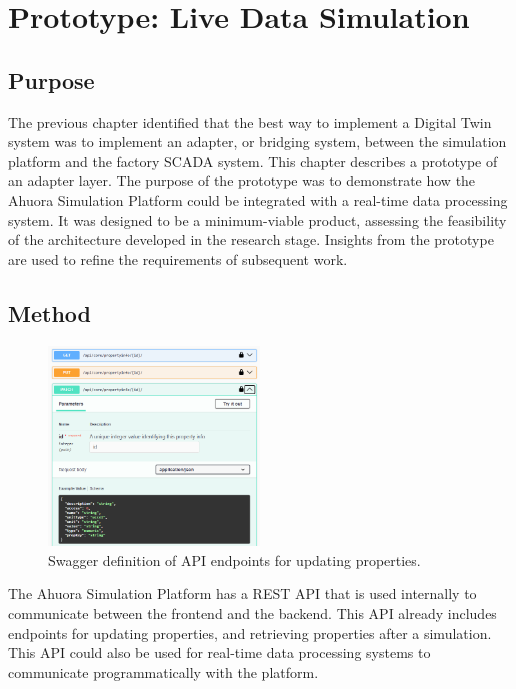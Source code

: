 \chapter{Prototype: Live Data Simulation} \label{sec:simulationprototype}

\section{Purpose}

The previous chapter identified that the best way to implement a Digital Twin system was to implement an adapter, or bridging system, between the simulation platform and the factory SCADA system. This chapter describes a prototype of an adapter layer.
The purpose of the prototype was to demonstrate how the Ahuora Simulation Platform could be integrated with a real-time data processing system. It was designed to be a minimum-viable product, assessing the feasibility of the architecture developed in the research stage. Insights from the prototype are used to refine the requirements of subsequent work.

\section{Method}

\begin{figure}
    \centering
    \includegraphics[width=0.5\textwidth]{swaggerprops.png}
    \caption{Swagger definition of API endpoints for updating properties.}
    \label{fig:swaggerendpoints}
\end{figure}

The Ahuora Simulation Platform has a REST API that is used internally to communicate between the frontend and the backend. This API already includes endpoints for updating properties, and retrieving properties after a simulation. This API could also be used for real-time data processing systems to communicate programmatically with the platform.

